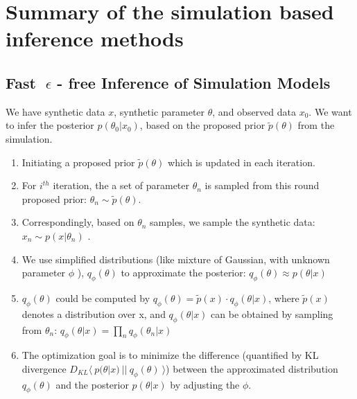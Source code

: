 \documentclass{article}
\begin{document}
\section{Summary of the simulation based inference methods}
\subsection{Fast $\epsilon$ - free Inference of Simulation Models}
We have synthetic data $x$, synthetic parameter $\theta$, and observed data $x_0$. We want to infer the posterior $p(\theta_0 | x_0)$, based on the proposed prior $\tilde{p}(\theta)$ from the simulation.

\begin{enumerate}[Step 1:]
\item Initiating a proposed prior $ \tilde{p}(\theta)$ which is updated in each iteration.
\item For $i^{th}$ iteration, the a set of parameter $\theta_n$ is sampled from this round proposed prior: $\theta_n \sim \tilde{p}(\theta)$.

\item Correspondingly, based on $\theta_n$ samples, we sample the synthetic data: $x_n \sim p(x|\theta_n)$ .

\item We use simplified distributions (like mixture of Gaussian, with unknown parameter $\phi$ ), $q_\phi(\theta)$ to approximate the posterior: $q_\phi(\theta)  \approx p(\theta|x)$

\item $q_\phi(\theta)$ could be computed by $q_\phi(\theta) = \tilde{p}(x) \cdot q_\phi(\theta|x) $, where $\tilde{p}(x)$ denotes a distribution over x, and $q_\phi(\theta|x) $ can be obtained by sampling from $\theta_n$: $q_\phi(\theta|x) = \prod_n q_\phi(\theta_n|x) $ 

\item The optimization goal is to minimize the difference (quantified by KL divergence $D_{KL} \langle \ p(\theta|x) \ || \ q_\phi(\theta) \ \rangle $) between the approximated distribution $q_\phi(\theta)$ and the posterior $p(\theta|x)$ by adjusting the $\phi$.


\end{enumerate}
\end{document}
